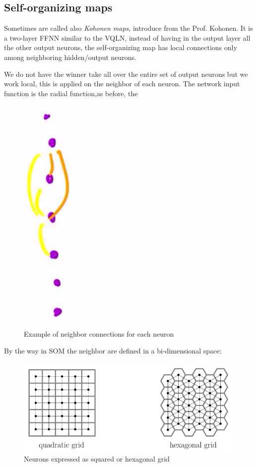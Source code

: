 \documentclass{article}
\begin{document}
\subsection{Self-organizing maps}
Sometimes are called also \textit{Kohonen maps}, introduce from the Prof. Kohonen. It is a two-layer
FFNN similar to the VQLN, instead of having in the output layer all the other output neurons, the
self-organizing map has local connections only among neighboring hidden/output neurons.

We do not have the winner take all over the entire set of output neurons but we work local, this is applied
on the neighbor of each neuron. The network input function is the radial function,as before, the
\begin{figure}[H]
    \centering
    \includegraphics[scale=0.5]{images/som_examp.png}
    \caption{Example of neighbor connections for each neuron}
\end{figure}
By the way in SOM the neighbor are defined in a bi-dimensional space:
\begin{figure}[H]
    \centering
    \includegraphics[scale=0.6]{images/som_bi.png}
    \caption{Neurons expressed as squared or hexagonal grid}
\end{figure}
\end{document}
